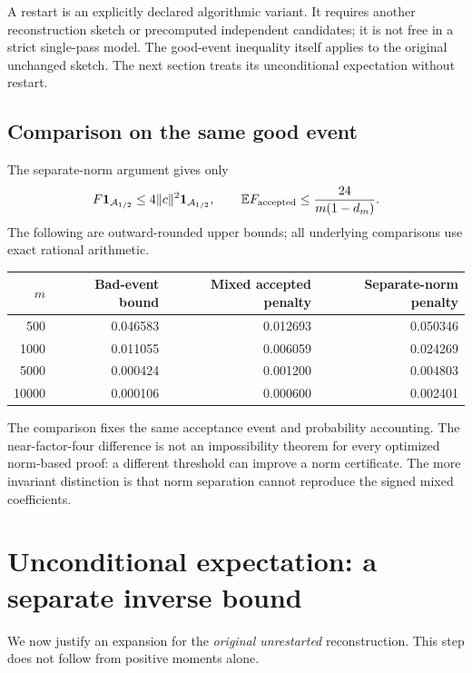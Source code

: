 \documentclass[11pt]{article}
\numberwithin{equation}{section}
\theoremstyle{definition}\newtheorem{definition}[theorem]{Definition}
\theoremstyle{remark}\newtheorem{remark}[theorem]{Remark}
\newcommand{\norm}[1]{\lVert#1\rVert}\newcommand{\ip}[2]{\langle#1,#2\rangle}
\begin{document}
A restart is an explicitly declared algorithmic variant. It requires another reconstruction sketch or precomputed independent candidates; it is not free in a strict single-pass model. The good-event inequality itself applies to the original unchanged sketch. The next section treats its unconditional expectation without restart.

\subsection{Comparison on the same good event}
The separate-norm argument gives only
\[
 F\mathbf1_{\mathcal A_{1/2}}\le4\norm c^2\mathbf1_{\mathcal A_{1/2}},
 \qquad \E F_{\rm accepted}\le\frac{24}{m(1-d_m)}.
\]
The following are outward-rounded upper bounds; all underlying comparisons use exact rational arithmetic.
\begin{center}
\begin{tabular}{r r r r}
\toprule
\(m\)&Bad-event bound&Mixed accepted penalty&Separate-norm penalty\\\midrule
500&0.046583&0.012693&0.050346\\
1000&0.011055&0.006059&0.024269\\
5000&0.000424&0.001200&0.004803\\
10000&0.000106&0.000600&0.002401\\\bottomrule
\end{tabular}
\end{center}
The comparison fixes the same acceptance event and probability accounting. The near-factor-four difference is not an impossibility theorem for every optimized norm-based proof: a different threshold can improve a norm certificate. The more invariant distinction is that norm separation cannot reproduce the signed mixed coefficients.

\par{}
\section{Unconditional expectation: a separate inverse bound}\label{p02:sec:inverse}
We now justify an expansion for the \emph{original unrestarted} reconstruction. This step does not follow from positive moments alone.
\end{document}
